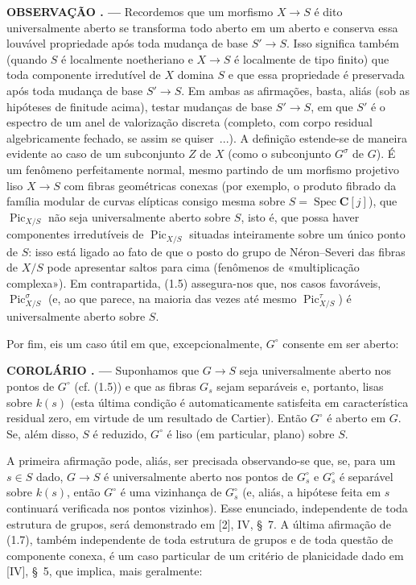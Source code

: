 \documentclass[11pt,twoside,openany]{book}
\numberwithin{equation}{section}
\newcommand{\src}[1]{%
  \phantomsection\hypertarget{src:#1}{}%
  \marginpar{\raggedleft\footnotesize\sffamily #1}%
}
\theoremstyle{plain}
\theoremstyle{definition}
\theoremstyle{remark}
\newcommand{\result}[2]{%
  \par\medskip\noindent\textbf{#1%
  \if\relax\detokenize{#2}\relax\else\space#2\fi. ---}\enspace
}
\newcommand{\FgaUnitKey}{frontmatter}
\renewcommand{\src}[1]{%
  \phantomsection\hypertarget{src:\FgaUnitKey:#1}{}%
  \marginpar{\raggedleft\footnotesize\sffamily #1}%
}
\begin{document}
\result{OBSERVAÇÃO}{1.6} Recordemos que um morfismo $X\longrightarrow S$ é
dito universalmente aberto se transforma todo aberto em um aberto e conserva
essa louvável propriedade após toda mudança de base $S'\longrightarrow S$.
Isso significa também (quando $S$ é localmente noetheriano e
$X\longrightarrow S$ é localmente de tipo finito) que toda componente
irredutível de $X$ domina $S$ e que essa propriedade é preservada após toda
mudança de base $S'\longrightarrow S$. Em ambas as afirmações, basta, aliás
(sob as hipóteses de finitude acima), testar mudanças de base
$S'\longrightarrow S$, em que $S'$ é o espectro de um anel de valorização
discreta (completo, com corpo residual algebricamente fechado, se assim se
quiser~...). A definição estende-se de maneira evidente ao caso de um
subconjunto $Z$ de $X$ (como o subconjunto $G^\sigma$ de $G$). É um fenômeno
perfeitamente normal, mesmo partindo de um morfismo projetivo liso
$X\longrightarrow S$ com fibras geométricas conexas (por exemplo, o produto
fibrado da família modular de curvas elípticas consigo mesma sobre
$S=\operatorname{Spec}\mathbf C[j]$), que $\operatorname{Pic}_{X/S}$ não
seja universalmente aberto sobre $S$, isto é, que possa haver componentes
irredutíveis de $\operatorname{Pic}_{X/S}$ situadas inteiramente sobre um
único ponto de $S$: isso está ligado ao fato de que o posto do grupo de
Néron--Severi das fibras de $X/S$ pode apresentar saltos para cima (fenômenos
de «multiplicação complexa»). Em contrapartida, (1.5) assegura-nos que, nos
casos favoráveis, $\operatorname{Pic}_{X/S}^\sigma$ (e, ao que parece, na
maioria das vezes até mesmo $\operatorname{Pic}_{X/S}^\tau$) é
universalmente aberto sobre $S$.
\src{229}
Por fim, eis um caso útil em que, excepcionalmente, $G^\circ$ consente em ser
aberto:

\result{COROLÁRIO}{1.7} Suponhamos que $G\longrightarrow S$ seja
universalmente aberto nos pontos de $G^\circ$ (cf. (1.5)) e que as fibras
$G_s$ sejam separáveis e, portanto, lisas sobre $k(s)$ (esta última condição é automaticamente satisfeita em
característica residual zero, em virtude de um resultado de Cartier). Então
$G^\circ$ é aberto em $G$. Se, além disso, $S$ é reduzido, $G^\circ$ é liso
(em particular, plano) sobre $S$.

A primeira afirmação pode, aliás, ser precisada observando-se que, se, para um
$s\in S$ dado, $G\longrightarrow S$ é universalmente aberto nos pontos de
$G_s^\circ$ e $G_s^\circ$ é separável sobre $k(s)$, então $G^\circ$ é uma
vizinhança de $G_s^\circ$ (e, aliás, a hipótese feita em $s$ continuará
verificada nos pontos vizinhos). Esse enunciado, independente de toda estrutura
de grupos, será demonstrado em [2], IV, §~7. A última afirmação de (1.7), também
independente de toda estrutura de grupos e de toda questão de componente
conexa, é um caso particular de um critério de planicidade dado em [IV], §~5,
que implica, mais geralmente:
\end{document}
